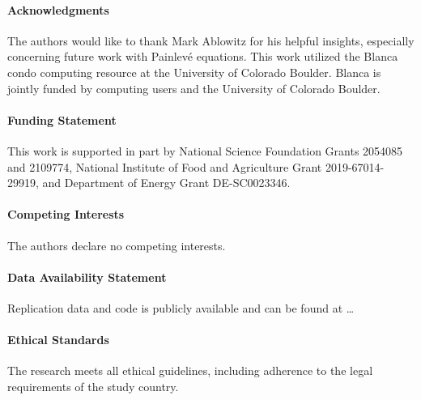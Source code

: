 \documentclass[journal=gmj]{CUP-JNL-DTM}%
\theoremstyle{definition}
\numberwithin{equation}{section}
\begin{document}


\begin{Backmatter}


\paragraph{Acknowledgments}
The authors would like to thank Mark Ablowitz for his helpful insights, especially concerning future work with Painlev\'e equations. This work utilized the Blanca condo computing resource at the University of Colorado Boulder. Blanca is jointly funded by computing users and the University of Colorado Boulder.


\paragraph{Funding Statement}
This work is supported in part by National Science Foundation Grants 2054085 and 2109774, National Institute of Food and Agriculture Grant 2019-67014-29919, and Department of Energy Grant DE-SC0023346.

\paragraph{Competing Interests}
The authors declare no competing interests.

\paragraph{Data Availability Statement}
{\color{red}Replication data and code is publicly available and can be found at \dots}

\paragraph{Ethical Standards}
The research meets all ethical guidelines, including adherence to the legal requirements of the study country.


\end{Backmatter}
\end{document}
